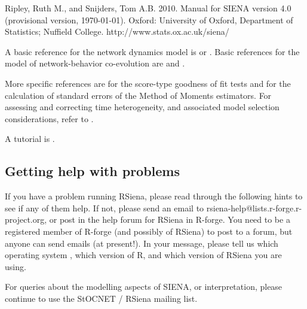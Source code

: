 \documentclass[a4paper,fleqn]{article}
\newcommand{\+}{\, + \,}
\newcommand{\Rn}{{\sf R}}
\newcommand{\rs}{{\sf RSiena}}
\newcommand{\RS}{{\sf RSiena }}
\newcommand{\SN}{{\sf StOCNET }}
\newcommand{\si}{{\sf SIENA}}
\begin{document}
{\noindent
Ripley, Ruth M., and Snijders, Tom A.B.
2010.
Manual for SIENA version 4.0 (provisional version, \today).
Oxford: University of Oxford, Department of Statistics; Nuffield College.
\textsf{http://www.stats.ox.ac.uk/siena/}

\smallskip

A basic reference for the network dynamics model is \citet{Snijders01}
or \citet{Snijders05}.
Basic references for the model of network-behavior co-evolution
are \citet*{SnijdersEA07} and \citet*{SteglichEA10}.

More specific references are \citet{Schweinberger10} for the score-type goodness
of fit tests and \citet{SchweinbergerSnijders07a} for the calculation of
standard errors of the Method of Moments estimators. For assessing and
correcting time heterogeneity, and associated model selection considerations,
refer to \citet*{Lospinoso2010a, Lospinoso2010b}.

A tutorial is \citet*{SnijdersEA10b}.


\subsection{Getting help with problems}
\label{sec:problems}
If you have a problem running \rs, please read through the following hints to
see if any of them help. If not, please send an email to
rsiena-help@lists.r-forge.r-project.org, or post in the help forum for \RS in
R-forge. You need to be a registered member of R-forge (and possibly of \rs)
to post to a forum, but anyone can send emails (at present!). In your message,
please tell us which operating system , which version of \Rn, and which version
of \RS you are using.

For queries about the modelling aspects of \si, or interpretation, please
continue to use the \SN/ \RS mailing list.


}
\end{document}
